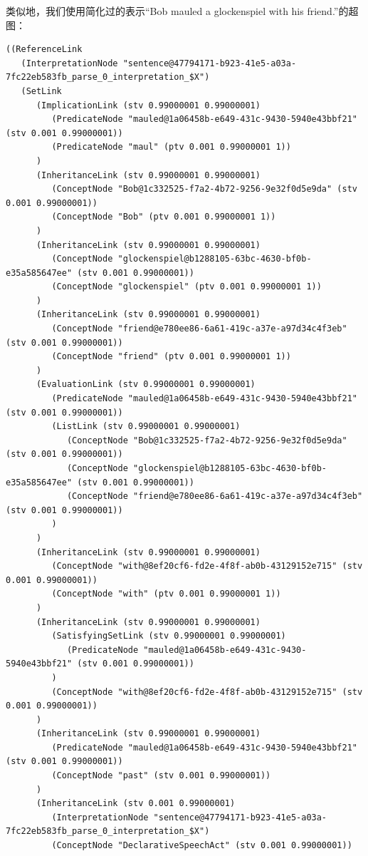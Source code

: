 类似地，我们使用简化过的表示“Bob mauled a glockenspiel with his friend.”的超图：

 {\tt\begin{tiny}\begin{lstlisting}
((ReferenceLink
   (InterpretationNode "sentence@47794171-b923-41e5-a03a-7fc22eb583fb_parse_0_interpretation_$X")
   (SetLink
      (ImplicationLink (stv 0.99000001 0.99000001)
         (PredicateNode "mauled@1a06458b-e649-431c-9430-5940e43bbf21" (stv 0.001 0.99000001))
         (PredicateNode "maul" (ptv 0.001 0.99000001 1))
      )
      (InheritanceLink (stv 0.99000001 0.99000001)
         (ConceptNode "Bob@1c332525-f7a2-4b72-9256-9e32f0d5e9da" (stv 0.001 0.99000001))
         (ConceptNode "Bob" (ptv 0.001 0.99000001 1))
      )
      (InheritanceLink (stv 0.99000001 0.99000001)
         (ConceptNode "glockenspiel@b1288105-63bc-4630-bf0b-e35a585647ee" (stv 0.001 0.99000001))
         (ConceptNode "glockenspiel" (ptv 0.001 0.99000001 1))
      )
      (InheritanceLink (stv 0.99000001 0.99000001)
         (ConceptNode "friend@e780ee86-6a61-419c-a37e-a97d34c4f3eb" (stv 0.001 0.99000001))
         (ConceptNode "friend" (ptv 0.001 0.99000001 1))
      )
      (EvaluationLink (stv 0.99000001 0.99000001)
         (PredicateNode "mauled@1a06458b-e649-431c-9430-5940e43bbf21" (stv 0.001 0.99000001))
         (ListLink (stv 0.99000001 0.99000001)
            (ConceptNode "Bob@1c332525-f7a2-4b72-9256-9e32f0d5e9da" (stv 0.001 0.99000001))
            (ConceptNode "glockenspiel@b1288105-63bc-4630-bf0b-e35a585647ee" (stv 0.001 0.99000001))
            (ConceptNode "friend@e780ee86-6a61-419c-a37e-a97d34c4f3eb" (stv 0.001 0.99000001))
         )
      )
      (InheritanceLink (stv 0.99000001 0.99000001)
         (ConceptNode "with@8ef20cf6-fd2e-4f8f-ab0b-43129152e715" (stv 0.001 0.99000001))
         (ConceptNode "with" (ptv 0.001 0.99000001 1))
      )
      (InheritanceLink (stv 0.99000001 0.99000001)
         (SatisfyingSetLink (stv 0.99000001 0.99000001)
            (PredicateNode "mauled@1a06458b-e649-431c-9430-5940e43bbf21" (stv 0.001 0.99000001))
         )
         (ConceptNode "with@8ef20cf6-fd2e-4f8f-ab0b-43129152e715" (stv 0.001 0.99000001))
      )
      (InheritanceLink (stv 0.99000001 0.99000001)
         (PredicateNode "mauled@1a06458b-e649-431c-9430-5940e43bbf21" (stv 0.001 0.99000001))
         (ConceptNode "past" (stv 0.001 0.99000001))
      )
      (InheritanceLink (stv 0.001 0.99000001)
         (InterpretationNode "sentence@47794171-b923-41e5-a03a-7fc22eb583fb_parse_0_interpretation_$X")
         (ConceptNode "DeclarativeSpeechAct" (stv 0.001 0.99000001))

\end{lstlisting}
\end{tiny}}
